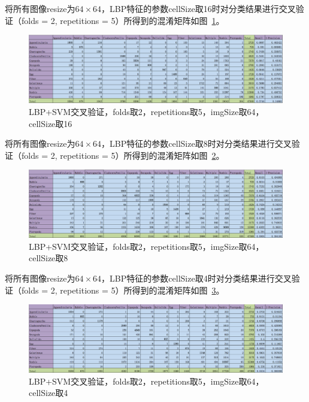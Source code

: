 \documentclass[12pt]{article}
\begin{document}
\begin{enumerate}
将所有图像resize为$64 \times 64$，LBP特征的参数cellSize取16时对分类结果进行交叉验证（folds = 2, repetitions = 5）所得到的混淆矩阵如图~\ref{fig: LBP-SVM-2-folds-5-repetitions-16-64}。
\begin{figure}[!ht]
\centering
\includegraphics[width=1.0\linewidth]{LBP-SVM-2-folds-5-repetitions-16-64}
\caption{LBP+SVM交叉验证，folds取2，repetitions取5，imgSize取64，cellSize取16}
\label{fig: LBP-SVM-2-folds-5-repetitions-16-64}
\end{figure}

将所有图像resize为$64 \times 64$，LBP特征的参数cellSize取8时对分类结果进行交叉验证（folds = 2, repetitions = 5）所得到的混淆矩阵如图~\ref{fig: LBP-SVM-2-folds-5-repetitions-8-64}。
\begin{figure}[!ht]
\centering
\includegraphics[width=1.0\linewidth]{LBP-SVM-2-folds-5-repetitions-8-64}
\caption{LBP+SVM交叉验证，folds取2，repetitions取5，imgSize取64，cellSize取8}
\label{fig: LBP-SVM-2-folds-5-repetitions-8-64}
\end{figure}

将所有图像resize为$64 \times 64$，LBP特征的参数cellSize取4时对分类结果进行交叉验证（folds = 2, repetitions = 5）所得到的混淆矩阵如图~\ref{fig: LBP-SVM-2-folds-5-repetitions-4-64}。
\begin{figure}[!ht]
\centering
\includegraphics[width=1.0\linewidth]{LBP-SVM-2-folds-5-repetitions-4-64}
\caption{LBP+SVM交叉验证，folds取2，repetitions取5，imgSize取64，cellSize取4}
\label{fig: LBP-SVM-2-folds-5-repetitions-4-64}
\end{figure}

\end{enumerate}
\end{document}
